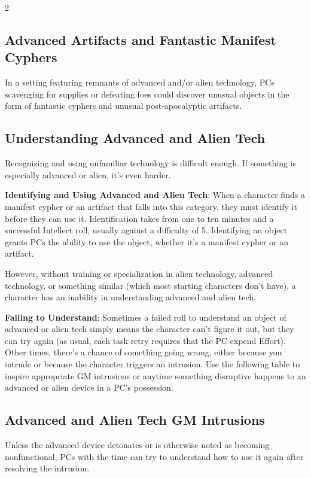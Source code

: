 \begin{multicols}{2}
\subsection{Advanced Artifacts and Fantastic Manifest Cyphers}

In a setting featuring remnants of advanced and/or alien technology, PCs scavenging for supplies or defeating foes could discover unusual objects in the form of fantastic cyphers and unusual post‑apocalyptic artifacts. 

\subsection{Understanding Advanced and Alien Tech}
 
Recognizing and using unfamiliar technology is difficult enough. If something is especially advanced or alien, it’s even harder. 

\textbf{Identifying and Using Advanced and Alien Tech}: When a character finds a manifest cypher or an artifact that falls into this category, they must identify it before they can use it. Identification takes from one to ten minutes and a successful Intellect roll, usually against a difficulty of 5. Identifying an object grants PCs the ability to use the object, whether it’s a manifest cypher or an artifact. 

However, without training or specialization in alien technology, advanced technology, or something similar (which most starting characters don’t have), a character has an inability in understanding advanced and alien tech. 

\textbf{Failing to Understand}: Sometimes a failed roll to understand an object of advanced or alien tech simply means the character can’t figure it out, but they can try again (as usual, each task retry requires that the PC expend Effort). Other times, there’s a chance of something going wrong, either because you intrude or because the character triggers an intrusion. Use the following table to inspire appropriate GM intrusions or anytime something disruptive happens to an advanced or alien device in a PC’s possession.

\subsection{Advanced and Alien Tech GM Intrusions}
 
Unless the advanced device detonates or is otherwise noted as becoming nonfunctional, PCs with the time can try to understand how to use it again after resolving the intrusion.

\end{multicols}

